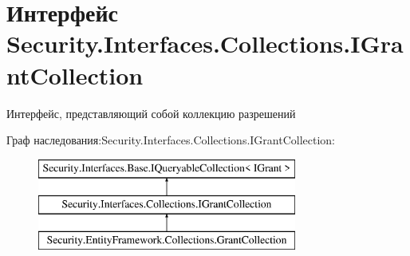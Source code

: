 \hypertarget{interface_security_1_1_interfaces_1_1_collections_1_1_i_grant_collection}{}\section{Интерфейс Security.\+Interfaces.\+Collections.\+I\+Grant\+Collection}
\label{interface_security_1_1_interfaces_1_1_collections_1_1_i_grant_collection}


Интерфейс, представляющий собой коллекцию разрешений  


Граф наследования\+:Security.\+Interfaces.\+Collections.\+I\+Grant\+Collection\+:\begin{figure}[H]
\begin{center}
\leavevmode
\includegraphics[height=3.000000cm]{df/d2c/interface_security_1_1_interfaces_1_1_collections_1_1_i_grant_collection}
\end{center}
\end{figure}
